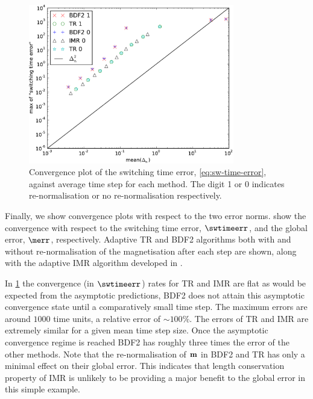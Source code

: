 \begin{figure}
  \centering
  \includegraphics[width=0.8\textwidth]{plots/ode_llg_adaptive_convergence/maxofswitchingtimeerrorvsmeanofdts}
  \caption{Convergence plot of the switching time error, \cref{eq:sw-time-error}, against average time step for each method. The digit 1 or 0 indicates re-normalisation or no re-normalisation respectively.}
  \label{fig:llg-ode-convergence-swtime}
\end{figure}


Finally, we show convergence plots with respect to the two error norms.
 show the convergence with respect to the switching time error, $\swtimeerr$, and the global error, $\merr$, respectively.
Adaptive TR and BDF2 algorithms both with and without re-normalisation of the magnetisation after
each step are shown, along with the adaptive IMR algorithm developed in .


In \cref{fig:llg-ode-convergence-swtime} the convergence (in $\swtimeerr$) rates for TR and IMR are flat as would be expected from the asymptotic predictions, BDF2 does not attain this asymptotic convergence state until a comparatively small time step.
The maximum errors are around $1000$ time units, a relative error of $\sim 100\%$.
The errors of TR and IMR are extremely similar for a given mean time step size.
Once the asymptotic convergence regime is reached BDF2 has roughly three times the error of the other methods.
Note that the re-normalisation of $\boldsymbol{\mathrm{m}}$ in BDF2 and TR has only a minimal effect on their global error.
This indicates that length conservation property of IMR is unlikely to be providing a major benefit to the global error in this simple example.


